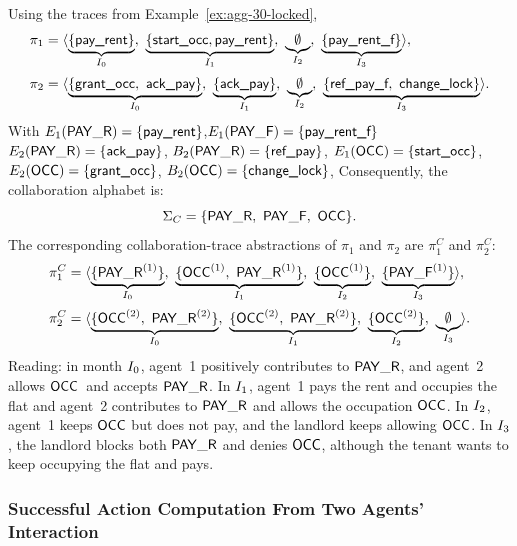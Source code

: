 \documentclass{article}
\begin{document}
  \begin{example}\label{ex:collab}
  Using the traces from Example~\ref{ex:agg-30-locked},
  \[
  \begin{aligned}
  \pi_1&=\trace{%
  \underbrace{\{\textsf{pay\_rent}\}}_{\Ik{0}},\ 
  \underbrace{\{\textsf{start\_occ}, \textsf{pay\_rent} \}}_{\Ik{1}},\ 
  \underbrace{\emptyset}_{\Ik{2}},\ 
  \underbrace{\{\textsf{pay\_rent\_f}\}}_{\Ik{3}}
  },\\[2pt]
  \pi_2&=\trace{%
  \underbrace{\{\textsf{grant\_occ},\ \textsf{ack\_pay}\}}_{\Ik{0}},\ 
  \underbrace{\{\textsf{ack\_pay}\}}_{\Ik{1}},\ 
  \underbrace{\emptyset}_{\Ik{2}},\ 
  \underbrace{\{\textsf{ref\_pay\_f},\ \textsf{change\_lock}\}}_{\Ik{3}}
  }.
  \end{aligned}
  \]
  With \(E_1(\mathsf{PAY\_R})=\{\textsf{pay\_rent}\}\),\(E_1(\mathsf{PAY\_F})=\{\textsf{pay\_rent\_f}\}\)
  \(E_2(\mathsf{PAY\_R})=\{\textsf{ack\_pay}\}\),
  \(B_2(\mathsf{PAY\_R})=\{\textsf{ref\_pay}\}\),
  \(E_1(\mathsf{OCC})=\{\textsf{start\_occ}\}\),
  \(E_2(\mathsf{OCC})=\{\textsf{grant\_occ}\}\),
  \(B_2(\mathsf{OCC})=\{\textsf{change\_lock}\}\),
  Consequently, the collaboration alphabet is:
  \[
  \Sigma_C=\{\mathsf{PAY\_R},\ \mathsf{PAY\_F},\ \mathsf{OCC}\}.
  \]
  The corresponding collaboration-trace abstractions of $\pi_1$ and $\pi_2$ are $\pi_1^C$ and $\pi_2^C$:
  \[
  \begin{aligned}
  \pi_1^{C}&=\trace{%
  \underbrace{\{\pay{1}\}}_{\Ik{0}},\ 
  \underbrace{\{\occ{1},\ \pay{1}\}}_{\Ik{1}},\ 
  \underbrace{\{\occ{1}\}}_{\Ik{2}},\ 
  \underbrace{\{\payf{1}\}}_{\Ik{3}}
  },\\[2pt]
  \pi_2^{C}&=\trace{%
  \underbrace{\{\occ{2},\ \pay{2}\}}_{\Ik{0}},\ 
  \underbrace{\{\occ{2},\ \pay{2}\}}_{\Ik{1}},\ 
  \underbrace{\{\occ{2}\}}_{\Ik{2}},\ 
  \underbrace{\emptyset}_{\Ik{3}}
  }.
  \end{aligned}
  \]
  Reading: in month \(I_{0}\), agent~1 positively contributes to $\mathsf{PAY\_R}$, and agent~2 allows $\mathsf{OCC}$\ and accepts $\mathsf{PAY\_R}$.
  In \(I_{1}\), agent~1 pays the rent and occupies the flat and agent~2 contributes to $\mathsf{PAY\_R}$ and allows the occupation $\mathsf{OCC}$. In \(I_{2}\), agent~1 keeps $\mathsf{OCC}$ but does not pay, and the landlord keeps allowing $\mathsf{OCC}$. In \(I_{3}\), the landlord blocks both $\mathsf{PAY\_R}$ and denies $\mathsf{OCC}$, although the tenant wants to keep occupying the flat and pays.
  \end{example}
  
  
  \subsubsection{Successful Action Computation From Two Agents' Interaction}
  
\end{document}
